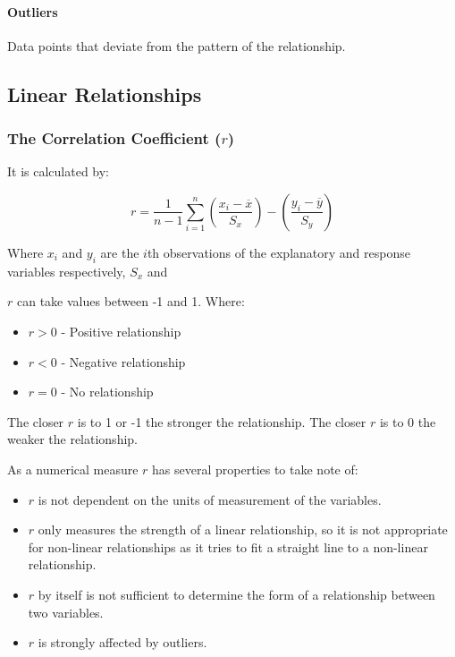 \documentclass[12pt letter]{report}
\begin{document}
\paragraph{Outliers}

Data points that deviate from the pattern of the relationship.

\subsection{Linear Relationships}

\subsubsection{The Correlation Coefficient ($r$)}


It is calculated by:

\[
	r = \frac{1}{n - 1} \sum^{n}_{i = 1} \left( \frac{x_{i} - \overline{x}}{S_{x}} \right) - \left( \frac{y_{i} -
		\overline{y}}{S_{y}} \right)
\]

Where $x_{i}$ and $y_{i}$ are the $i$th observations of the explanatory and response variables respectively, $S_{x}$ and

$r$ can take values between -1 and 1. Where:

\begin{itemize}
	\item $r > 0$ - Positive relationship
	\item $r < 0 $ - Negative relationship
	\item $r = 0$ - No relationship
\end{itemize}

The closer $r$ is to 1 or -1 the stronger the relationship. The closer $r$ is to 0 the weaker the relationship.

As a numerical measure $r$ has several properties to take note of:

\begin{itemize}
	\item $r$ is not dependent on the units of measurement of the variables.
	\item $r$ only measures the strength of a linear relationship, so it is not appropriate for non-linear relationships
	      as it tries to fit a straight line to a non-linear relationship.
	\item $r$ by itself is not sufficient to determine the form of a relationship between two variables.
	\item $r$ is strongly affected by outliers.
\end{itemize}
\end{document}
